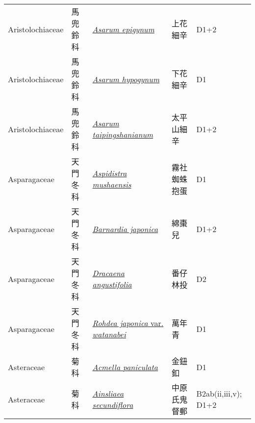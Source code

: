 {\begin{longtable}{L{2.5cm}L{2cm}L{5cm}L{2.5cm}L{3cm}}
    Aristolochiaceae & 馬兜鈴科 & \href{http://www.theplantlist.org/tpl1.1/search?q=Asarum+epigynum}{\textit{Asarum epigynum} } & 上花細辛 & D1+2    \\
    Aristolochiaceae & 馬兜鈴科 & \href{http://www.theplantlist.org/tpl1.1/search?q=Asarum+hypogynum}{\textit{Asarum hypogynum} } & 下花細辛 & D1    \\
    Aristolochiaceae & 馬兜鈴科 & \href{http://www.theplantlist.org/tpl1.1/search?q=Asarum+taipingshanianum}{\textit{Asarum taipingshanianum} } & 太平山細辛 & D1+2    \\
    Asparagaceae & 天門冬科 & \href{http://www.theplantlist.org/tpl1.1/search?q=Aspidistra+mushaensis}{\textit{Aspidistra mushaensis} } & 霧社蜘蛛抱蛋 & D1    \\
    Asparagaceae & 天門冬科 & \href{http://www.theplantlist.org/tpl1.1/search?q=Barnardia+japonica}{\textit{Barnardia japonica} } & 綿棗兒 & D1+2    \\
    Asparagaceae & 天門冬科 & \href{http://www.theplantlist.org/tpl1.1/search?q=Dracaena+angustifolia}{\textit{Dracaena angustifolia} } & 番仔林投 & D2    \\
    Asparagaceae & 天門冬科 & \href{http://www.theplantlist.org/tpl1.1/search?q=Rohdea+japonica+var.+watanabei}{\textit{Rohdea japonica} var. \textit{watanabei} } & 萬年青 & D1    \\
    Asteraceae & 菊科 & \href{http://www.theplantlist.org/tpl1.1/search?q=Acmella+paniculata}{\textit{Acmella paniculata} } & 金鈕釦 & D1    \\
    Asteraceae & 菊科 & \href{http://www.theplantlist.org/tpl1.1/search?q=Ainsliaea+secundiflora}{\textit{Ainsliaea secundiflora} } & 中原氏鬼督郵 & B2ab(ii,iii,v); D1+2    \\

\end{longtable}}
